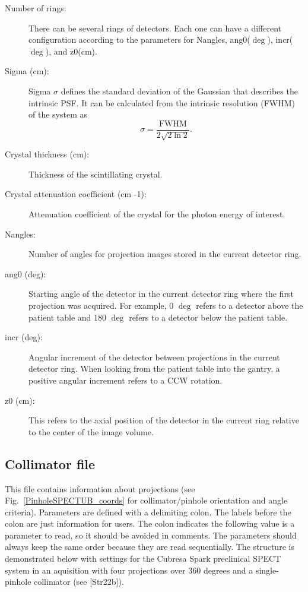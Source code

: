 \documentclass{article}
\begin{document}
{{{{\begin{description}
\item[Number of rings:] There can be several rings of detectors. Each one can have a different configuration according to the parameters for Nangles, ang0($\mathrm{\deg}$), incr($\mathrm{\deg}$), and z0($\mathrm{cm}$).

\item[Sigma (cm):] Sigma $\sigma$ defines the standard deviation of the Gaussian that describes the intrinsic PSF. It can be calculated from the intrinsic resolution (FWHM) of the system as 
\begin{equation}
 \sigma = \frac{\mathrm{FWHM}}{2\sqrt{2\ln{2}}}.
\end{equation}

\item[Crystal thickness (cm):] Thickness of the scintillating crystal.

\item[Crystal attenuation coefficient (cm -1):] Attenuation coefficient of the crystal for the photon energy of interest.

\item[Nangles:] Number of angles for projection images stored in the current detector ring.

\item[ang0 (deg):] Starting angle of the detector in the current detector ring where the first projection was acquired. For example, 0 $\mathrm{\deg}$ refers to a detector above the patient table and 180 $\mathrm{\deg}$ refers to a detector below the patient table.

\item[incr (deg):] Angular increment of the detector between projections in the current detector ring. When looking from the patient table into the gantry, a positive angular increment refers to a CCW rotation.

\item[z0 (cm):] This refers to the axial position of the detector in the current ring relative to the center of the image volume.

\end{description}

{ {\subsection*{{Collimator file} }
This file contains information about projections (see Fig.~\ref{PinholeSPECTUB_coords} for collimator/pinhole orientation and angle criteria). Parameters are defined with a delimiting colon. The labels before the colon are just information for users. The colon indicates the following value is a parameter to read, so it should be avoided in comments. The parameters should always keep the same order because they are read sequentially. The structure is demonstrated below with settings for the Cubresa Spark preclinical SPECT system in an aquisition with four projections over 360 degrees and a single-pinhole collimator (see [Str22b]).

}}}}}}
\end{document}
